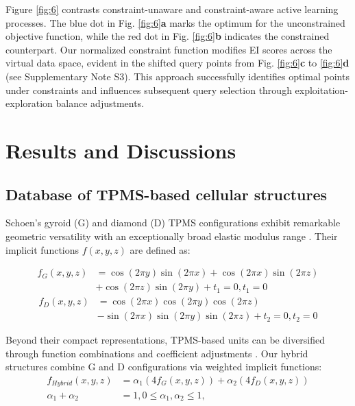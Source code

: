 \documentclass[preprint,review,12pt,authoryear]{elsarticle}
\begin{document}
Figure \ref{fig:6} contrasts constraint-unaware and constraint-aware active learning processes. The blue dot in Fig. \ref{fig:6}\textbf{a} marks the optimum for the unconstrained objective function, while the red dot in Fig. \ref{fig:6}\textbf{b} indicates the constrained counterpart. Our normalized constraint function modifies EI scores across the virtual data space, evident in the shifted query points from Fig. \ref{fig:6}\textbf{c} to \ref{fig:6}\textbf{d} (see Supplementary Note S3). This approach successfully identifies optimal points under constraints and influences subsequent query selection through exploitation-exploration balance adjustments.

\section{Results and Discussions}
\subsection{Database of TPMS-based cellular structures}

Schoen's gyroid (G) and diamond (D) TPMS configurations exhibit remarkable geometric versatility with an exceptionally broad elastic modulus range \citep{Lee2016}. Their implicit functions $f(x,y,z)$ are defined as:

\begin{equation}
\begin{aligned}
f_G(x,y,z)&= \cos(2\pi y)\sin(2\pi x)+\cos(2\pi x)\sin(2\pi z)\\&+\cos(2\pi z)\sin(2\pi y)+t_1 = 0, t_1 =0
\end{aligned}
\label{eq:15}
\end{equation}
\begin{equation}
\begin{aligned}
f_D(x,y,z)&=\cos(2\pi x)\cos(2\pi y)\cos(2\pi z)\\&-\sin(2\pi x)\sin(2\pi y)\sin(2\pi z)+t_2=0, t_2 =0
\end{aligned}
\label{eq:16}
\end{equation}

Beyond their compact representations, TPMS-based units can be diversified through function combinations and coefficient adjustments \citep{Wang2019b}. Our hybrid structures combine G and D configurations via weighted implicit functions:
\begin{equation}
\begin{aligned}
    f_{Hybrid}(x, y, z) &=\alpha_1 (4f_G(x,y,z))+\alpha_2(4f_D(x, y,z ))\\
    \alpha_1+\alpha_2 &= 1,
    0\leq\alpha_1, \alpha_2 \leq1,
\end{aligned}
\label{eq:17}
\end{equation}
\end{document}
